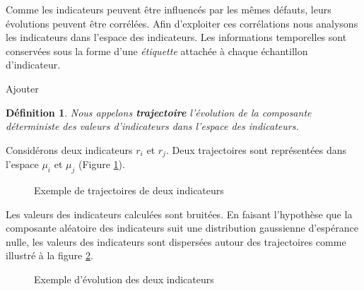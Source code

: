 \documentclass{article}
\newtheorem{definition}{Définition}
\begin{document}
Comme les indicateurs peuvent être influencés par les mêmes défauts, leurs évolutions peuvent être corrélées. 
Afin d'exploiter ces corrélations nous analysons les indicateurs dans l'espace des indicateurs.
Les informations temporelles sont conservées sous la forme d'une \textit{étiquette} attachée à chaque échantillon d'indicateur.

Ajouter



\begin{definition}
Nous appelons \textbf{trajectoire} l'évolution de la composante déterministe des valeurs d'indicateurs dans l'espace des indicateurs.
\end{definition}

Considérons deux indicateurs $r_i$ et $r_j$. 
Deux trajectoires sont représentées dans l'espace $\mu_i$ et $\mu_j$  (Figure \ref{fig:trajectoiremu}).

\begin{figure}[H]
\centering
{}
\caption{Exemple de trajectoires de deux indicateurs}
\label{fig:trajectoiremu}
\end{figure}

Les valeurs des indicateurs calculées sont bruitées. 
En faisant l'hypothèse que la composante aléatoire des indicateurs suit une distribution gaussienne d'espérance nulle, les valeurs des indicateurs sont dispersées autour des trajectoires comme illustré à la figure \ref{fig:exampletrajectoirer}. 
\begin{figure}[H]
\centering
{}
\caption{Exemple d'évolution des deux indicateurs}
\label{fig:exampletrajectoirer}
\end{figure}
\end{document}
